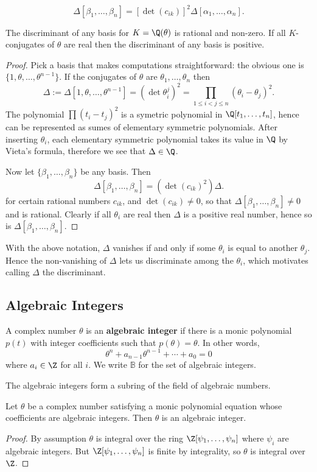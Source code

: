 \[\Delta[\beta_1,\dots,\beta_n]=[\det(c_{ik})]^2\Delta[\alpha_1,\dots,\alpha_n].\]
\begin{theorem}\label{discriminant rational}
The discriminant of any basis for $K=\Q(\theta)$ is rational and non-zero. If all $K$-conjugates of $\theta$ are real then the discriminant of any basis is positive.
\end{theorem}
\begin{proof}
Pick a basis that makes computations straightforward: the obvious one is $\{1,\theta,\dots,\theta^{n-1}\}$. If the conjugates of $\theta$ are $\theta_1,\dots,\theta_{n}$ then
\[\Delta:=\Delta[1,\theta,\dots,\theta^{n-1}]=(\det\theta_i^j)^2=\prod_{1\leq i<j\leq n}(\theta_i-\theta_j)^2.\]
The polynomial $\prod(t_i-t_j)^2$ is a symetric polynomial in $\Q[t_1,\dots,t_n]$, hence can be represented as sumes of elementary symmetric polynomials. After inserting $\theta_i$, each elementary symmetric polynomial takes its value in $\Q$ by Vieta's formula, therefore we see that $\Delta\in\Q$.\par
Now let $\{\beta_1,\dots,\beta_n\}$ be any basis. Then
\[\Delta[\beta_1,\dots,\beta_n]=(\det(c_{ik})^2)\Delta.\]
for certain rational numbers $c_{ik}$, and $\det(c_{ik})\neq0$, so that $\Delta[\beta_1,\dots,\beta_n]\neq0$ and is rational. Clearly if all $\theta_i$ are real then $\Delta$ is a positive real number, hence so is $\Delta[\beta_1,\dots,\beta_n]$.
\end{proof}
With the above notation, $\Delta$ vanishes if and only if some $\theta_i$ is equal to another $\theta_j$. Hence the non-vanishing of $\Delta$ lets us discriminate among the $\theta_i$, which motivates calling $\Delta$ the discriminant.
\subsection{Algebraic Integers}
A complex number $\theta$ is an \textbf{algebraic integer} if there is a monic polynomial $p(t)$ with integer coefficients such that $p(\theta)=\theta$. In other words,
\[\theta^{n}+a_{n-1}\theta^{n-1}+\cdots+a_0=0\]
where $a_i\in\Z$ for all $i$. We write $\mathbb{B}$ for the set of algebraic integers.
\begin{theorem}
The algebraic integers form a subring of the field of algebraic numbers.
\end{theorem}
\begin{theorem}
Let $\theta$ be a complex number satisfying a monic polynomial equation whose coefficients are algebraic integers. Then $\theta$ is an algebraic integer.
\end{theorem}
\begin{proof}
By assumption $\theta$ is integral over the ring $\Z[\psi_1,\dots,\psi_n]$ where $\psi_i$ are algebraic integers. But $\Z[\psi_1,\dots,\psi_n]$ is finite by integrality, so $\theta$ is integral over $\Z$.
\end{proof}

